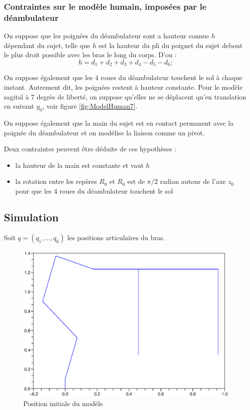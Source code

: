 \documentclass[a4paper, 10pt ]{article}
\begin{document}
\subsubsection{Contraintes sur le modèle humain, imposées par le déambulateur}

On suppose que les poignées du déambulateur sont a hauteur connue $h$ dépendant du sujet, telle que $h$ est la hauteur du pli du poignet du sujet debout le plus droit possible avec les bras le long du corps. D'ou :
\begin{equation}
h = d_1+d_2+d_3+d_4-d_5-d_6;
\end{equation}

On suppose également que les 4 roues du déambulateur touchent le sol à chaque instant. Autrement dit, les poignées restent à hauteur constante. Pour le modèle sagital à 7 degrès de liberté, on suppose qu'elles ne se déplacent qu'en translation en suivant $y_0$, voir figure \ref{fig:ModelHuman7}.

On suppose également que la main du sujet est en contact permanent avec la poignée du déambulateur et on modélise la liaison comme un pivot.

Deux contraintes peuvent être déduite de ces hypothèses : 
\begin{itemize}
\item la hauteur de la main est constante et vaut $h$
\item la rotation entre les repères $R_0$ et $R_6$ est de $\pi/2$ radian autour de l'axe $z_0$ pour que les 4 roues du déambulateur touchent le sol
\end{itemize}

\subsection{Simulation}

Soit $q=(q_1,...,q_6)$ les positions articulaires du bras. 

\begin{figure}[h]
\centering
\includegraphics[width=0.8\columnwidth]{images/simu/positionInit.eps}
\caption{Position initiale du modèle}
\label{fig:positionInit}
\end{figure}
\end{document}
